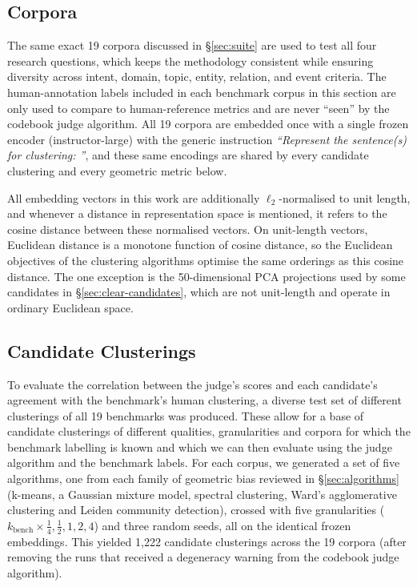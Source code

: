 \documentclass[11pt,a4paper,oneside]{report}
\begin{document}
\subsection{Corpora}

The same exact 19 corpora discussed in \S\ref{sec:suite} are used to test all four research questions, which keeps the methodology consistent while ensuring diversity across intent, domain, topic, entity, relation, and event criteria. The human-annotation labels included in each benchmark corpus in this section are only used to compare to human-reference metrics and are never ``seen'' by the codebook judge algorithm. All 19 corpora are embedded once with a single frozen encoder ({\small\ttfamily instructor-large}) with the generic instruction \emph{``Represent the sentence(s) for clustering: ''}, and these same encodings are shared by every candidate clustering and every geometric metric below.

All embedding vectors in this work are additionally $\ell_2$-normalised to unit length, and whenever a distance in representation space is mentioned, it refers to the cosine distance between these normalised vectors. On unit-length vectors, Euclidean distance is a monotone function of cosine distance, so the Euclidean objectives of the clustering algorithms optimise the same orderings as this cosine distance. The one exception is the 50-dimensional PCA projections used by some candidates in \S\ref{sec:clear-candidates}, which are not unit-length and operate in ordinary Euclidean space.

\subsection{Candidate Clusterings}

To evaluate the correlation between the judge's scores and each candidate's agreement with the benchmark's human clustering, a diverse test set of different clusterings of all 19 benchmarks was produced. These allow for a base of candidate clusterings of different qualities, granularities and corpora for which the benchmark labelling is known and which we can then evaluate using the judge algorithm and the benchmark labels. For each corpus, we generated a set of five algorithms, one from each family of geometric bias reviewed in \S\ref{sec:algorithms} (k-means, a Gaussian mixture model, spectral clustering, Ward's agglomerative clustering and Leiden community detection), crossed with five granularities ($k_{\mathrm{bench}} \times \tfrac14, \tfrac12, 1, 2, 4$) and three random seeds, all on the identical frozen embeddings. This yielded 1{,}222 candidate clusterings across the 19 corpora (after removing the runs that received a degeneracy warning from the codebook judge algorithm).
\end{document}
